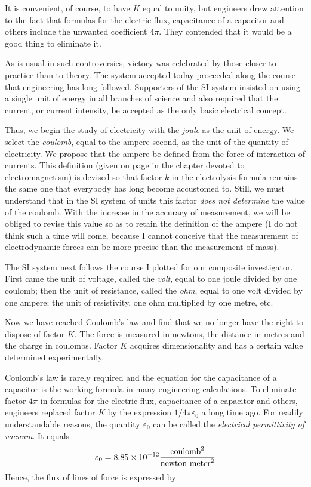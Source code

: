 It is convenient, of course, to have $K$ equal to unity, but engineers drew attention to the fact that formulas for the electric flux, capacitance of a capacitor and others include the unwanted coefficient $4\pi$. They contended that it would be a good thing to eliminate it.

As is usual in such controversies, victory was celebrated by those closer to practice than to theory. The system accepted today proceeded along the course that engineering has long followed. Supporters of the SI system insisted on using a single unit of energy in all branches of science and also required that the current, or current intensity, be accepted as the only basic electrical concept.

Thus, we begin the study of electricity with the \emph{joule} as the unit of energy. We select the \emph{coulomb}, equal to the ampere-second, as the unit of the quantity of electricity. We propose that the ampere be defined from the force of interaction of currents. This definition (given on page \pageref{ampere-def} in the chapter devoted to electromagnetism) is devised so that factor $k$ in the electrolysis formula remains the same one that everybody has long become accustomed to. Still, we must understand that in the SI system of units this factor \emph{does not determine} the value of the coulomb. With the increase in the accuracy of measurement, we will be obliged to revise this value so as to retain the definition of the ampere (I do not think such a time will come, because I cannot conceive that the measurement of electrodynamic forces can be more precise than the measurement of mass).

The SI system next follows the course I plotted for our composite investigator. First came the unit of voltage, called the \emph{volt}, equal to one joule divided by one coulomb; then the unit of resistance, called the \emph{ohm}, equal to one volt divided by one ampere; the unit of resistivity, one ohm multiplied by one metre, etc.

Now we have reached Coulomb's law and find that we no longer have the right to dispose of factor $K$. The force is measured in newtons, the distance in metres and the charge in coulombs. Factor $K$ acquires dimensionality and has a certain value determined experimentally.

Coulomb's law is rarely required and the equation for the capacitance of a capacitor is the working formula in many engineering calculations. To eliminate factor $4\pi$ in formulas for the electric flux, capacitance of a capacitor and others, engineers replaced factor $K$ by the expression $1/4\pi \varepsilon_{0}$ a long time ago. For readily understandable reasons, the quantity $\varepsilon_{0}$ can be called the \emph{electrical permittivity of vacuum}. It equals
\begin{equation*}%
\varepsilon_{0} = \num{8.85d-12} \frac{\textrm{coulomb}^{2}}{\textrm{newton-meter}^{2}}
\end{equation*}
Hence, the flux of lines of force is expressed by

